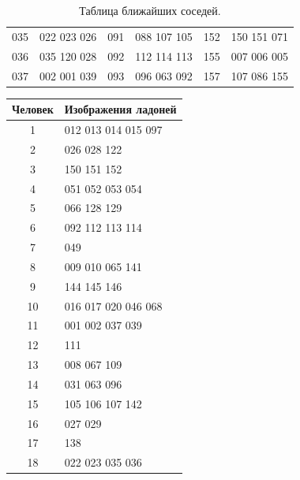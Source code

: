 \documentclass[12pt,fleqn]{article}
\begin{document}
\begin{table}[h]
\begin{center}
\begin{tabular}{|c|c|c|c|c|c|}
         035 &            022 023 026  &         091 &            088 107 105  &         152 &            150 151 071  \\
         036 &            035 120 028  &         092 &            112 114 113  &         155 &            007 006 005  \\
         037 &            002 001 039  &         093 &            096 063 092  &         157 &            107 086 155  \\ \hline
\end{tabular}
\caption{Таблица ближайших соседей.}
\label{tabular1}
\end{center}
\end{table}


\newpage
\begin{table}[H]
\begin{center}
\begin{tabular}{|c|l|}
\toprule
\hline
Человек &               Изображения ладоней \\ \hline
\midrule
       1 &              012 013 014 015 097  \\
       2 &                      026 028 122  \\
       3 &                      150 151 152  \\
       4 &                  051 052 053 054  \\
       5 &                      066 128 129  \\
       6 &                  092 112 113 114  \\
       7 &                              049  \\
       8 &                  009 010 065 141  \\
       9 &                      144 145 146  \\
      10 &              016 017 020 046 068  \\
      11 &                  001 002 037 039  \\
      12 &                              111  \\
      13 &                      008 067 109  \\
      14 &                      031 063 096  \\
      15 &                  105 106 107 142  \\
      16 &                          027 029  \\
      17 &                              138  \\
      18 &                  022 023 035 036  \\

\end{tabular}
\end{center}
\end{table}
\end{document}
